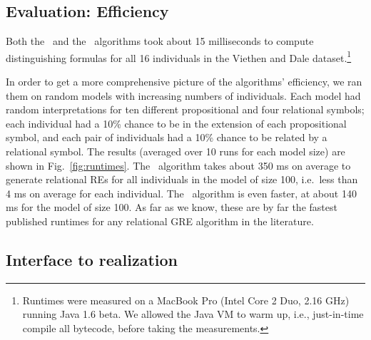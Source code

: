 





\subsection{Evaluation: Efficiency}

Both the \el\ and the \alc\ algorithms took about 15 milliseconds to
compute distinguishing formulas for all 16 individuals in the Viethen
and Dale dataset.\footnote{Runtimes were measured on a MacBook Pro
  (Intel Core 2 Duo, 2.16 GHz) running Java 1.6 beta.  We allowed the
  Java VM to warm up, i.e., just-in-time compile all bytecode, before
  taking the measurements.}

In order to get a more comprehensive picture of the algorithms'
efficiency, we ran them on random models with increasing numbers of
individuals.  Each model had random interpretations for ten different
propositional and four relational symbols; each individual had a 10\%
chance to be in the extension of each propositional symbol, and each
pair of individuals had a 10\% chance to be related by a relational
symbol.  The results (averaged over 10 runs for each model size) are
shown in Fig.~\ref{fig:runtimes}.  The \el\
algorithm takes about 350 ms on average to generate relational REs for
all individuals in the model of size 100, i.e.\ less than 4 ms on
average for each individual.  The \alc\ algorithm is even faster, at
about 140 ms for the model of size 100.  As far as we know, these are
by far the fastest published runtimes for any relational GRE algorithm
in the literature.




\subsection{Interface to realization}
\label{sec:discussion-realization}


